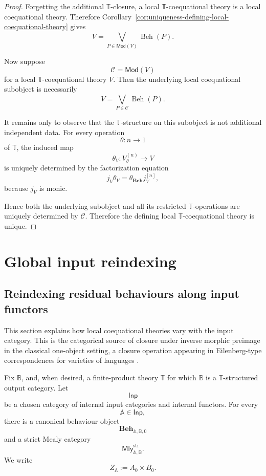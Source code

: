 \begin{proof}
    Forgetting the additional \(\mathbb T\)-closure, a local
    \(\mathbb T\)-coequational theory is a local coequational theory.
    Therefore
    Corollary~\ref{cor:uniqueness-defining-local-coequational-theory}
    gives
    \[
        V
        =
        \bigvee_{P\in\mathsf{Mod}(V)}
        \operatorname{Beh}(P).
    \]

    Now suppose
    \[
        \mathcal C=\mathsf{Mod}(V)
    \]
    for a local \(\mathbb T\)-coequational theory \(V\). Then the underlying
    local coequational subobject is necessarily
    \[
        V
        =
        \bigvee_{P\in\mathcal C}
        \operatorname{Beh}(P).
    \]

    It remains only to observe that the \(\mathbb T\)-structure on this
    subobject is not additional independent data. For every operation
    \[
        \theta:n\to1
    \]
    of \(\mathbb T\), the induced map
    \[
        \theta_V:
        V^{(n)}_\theta\to V
    \]
    is uniquely determined by the factorization equation
    \[
        j_V\theta_V
        =
        \theta_{\mathbf{Beh}}j_V^{[n]},
    \]
    because \(j_V\) is monic.

    Hence both the underlying subobject and all its restricted
    \(\mathbb T\)-operations are uniquely determined by \(\mathcal C\).
    Therefore the defining local \(\mathbb T\)-coequational theory is unique.
\end{proof}

\section{Global input reindexing}
\label{sec:global-input-reindexing}

\subsection{Reindexing residual behaviours along input functors}
\label{subsec:input-reindexing-behaviours}

This section explains how local coequational theories vary with the input
category. This is the categorical source of closure under inverse morphic
preimage in the classical one-object setting, a closure operation appearing in
Eilenberg-type correspondences for varieties of languages
\cite{Eilenberg1974,AdamekMiliusMyersUrbat2019TOCL}.

Fix \(\mathbb B\), and, when desired, a finite-product theory \(\mathbb T\) for
which \(\mathbb B\) is a \(\mathbb T\)-structured output category. Let
\[
    \mathsf{Inp}
\]
be a chosen category of internal input categories and internal functors. For
every
\[
    \mathbb A\in\mathsf{Inp},
\]
there is a canonical behaviour object
\[
    \mathbf{Beh}_{\mathbb A,\mathbb B,0}
\]
and a strict Mealy category
\[
    \mathsf{Mly}^{\mathrm{str}}_{\mathbb A,\mathbb B}.
\]
We write
\[
    Z_{\mathbb A}:=A_0\times B_0.
\]

